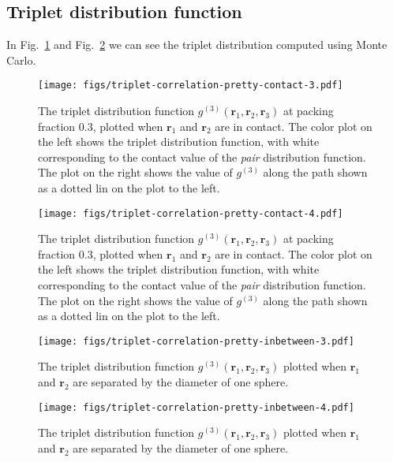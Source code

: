 \documentclass[letterpaper,twocolumn,amsmath,amssymb,pre,aps,10pt]{revtex4-1}
\newcommand{\rr}{\textbf{r}}
\begin{document}
\subsection{Triplet distribution function}

In Fig.~\ref{fig:triplet-distribution-3} and
Fig.~\ref{fig:triplet-distribution-4} we can see the triplet
distribution computed using Monte Carlo.

\begin{figure}
  \texttt{[image: figs/triplet-correlation-pretty-contact-3.pdf]}
  \caption{The triplet distribution function
    $g^{(3)}(\rr_1,\rr_2,\rr_3)$ at packing fraction 0.3, plotted when
    $\rr_1$ and $\rr_2$ are in contact.  The color plot on the left
    shows the triplet distribution function, with white corresponding
    to the contact value of the \emph{pair} distribution function.
    The plot on the right shows the value of $g^{(3)}$ along the path
    shown as a dotted lin on the plot to the
    left.}\label{fig:triplet-distribution-3}
\end{figure}
\begin{figure}
  \texttt{[image: figs/triplet-correlation-pretty-contact-4.pdf]}
  \caption{The triplet distribution function
    $g^{(3)}(\rr_1,\rr_2,\rr_3)$ at packing fraction 0.3, plotted when
    $\rr_1$ and $\rr_2$ are in contact.  The color plot on the left
    shows the triplet distribution function, with white corresponding
    to the contact value of the \emph{pair} distribution function.
    The plot on the right shows the value of $g^{(3)}$ along the path
    shown as a dotted lin on the plot to the
    left.}\label{fig:triplet-distribution-4}
\end{figure}

\begin{figure}
  \texttt{[image: figs/triplet-correlation-pretty-inbetween-3.pdf]}
  \caption{The triplet distribution function
    $g^{(3)}(\rr_1,\rr_2,\rr_3)$ plotted when $\rr_1$ and $\rr_2$ are
    separated by the diameter of one sphere.}\label{fig:triplet-gap-distribution-3}
\end{figure}
\begin{figure}
  \texttt{[image: figs/triplet-correlation-pretty-inbetween-4.pdf]}
  \caption{The triplet distribution function
    $g^{(3)}(\rr_1,\rr_2,\rr_3)$ plotted when $\rr_1$ and $\rr_2$ are
    separated by the diameter of one sphere.}\label{fig:triplet-gap-distribution-4}
\end{figure}
\end{document}
